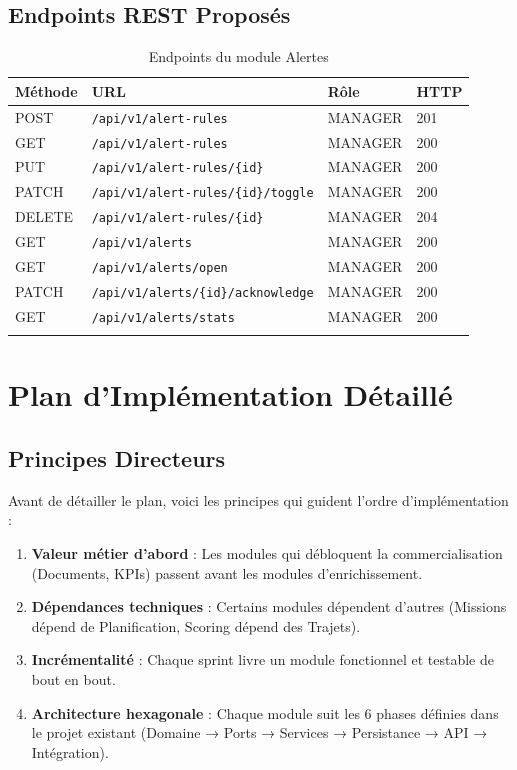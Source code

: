 \documentclass[12pt,a4paper]{report}
\begin{document}
\section{Endpoints REST Proposés}

\begin{longtable}{p{1.5cm}p{7cm}p{2.5cm}p{1.5cm}}
\toprule
\textbf{Méthode} & \textbf{URL} & \textbf{Rôle} & \textbf{HTTP} \\
\midrule
\endhead
POST & \texttt{/api/v1/alert-rules} & MANAGER & 201 \\
GET & \texttt{/api/v1/alert-rules} & MANAGER & 200 \\
PUT & \texttt{/api/v1/alert-rules/\{id\}} & MANAGER & 200 \\
PATCH & \texttt{/api/v1/alert-rules/\{id\}/toggle} & MANAGER & 200 \\
DELETE & \texttt{/api/v1/alert-rules/\{id\}} & MANAGER & 204 \\
GET & \texttt{/api/v1/alerts} & MANAGER & 200 \\
GET & \texttt{/api/v1/alerts/open} & MANAGER & 200 \\
PATCH & \texttt{/api/v1/alerts/\{id\}/acknowledge} & MANAGER & 200 \\
GET & \texttt{/api/v1/alerts/stats} & MANAGER & 200 \\
\bottomrule
\caption{Endpoints du module Alertes}
\end{longtable}

\chapter{Plan d'Implémentation Détaillé}

\section{Principes Directeurs}

Avant de détailler le plan, voici les principes qui guident l'ordre d'implémentation :

\begin{enumerate}[leftmargin=2cm]
  \item \textbf{Valeur métier d'abord} : Les modules qui débloquent la commercialisation (Documents, KPIs) passent avant les modules d'enrichissement.
  \item \textbf{Dépendances techniques} : Certains modules dépendent d'autres (Missions dépend de Planification, Scoring dépend des Trajets).
  \item \textbf{Incrémentalité} : Chaque sprint livre un module fonctionnel et testable de bout en bout.
  \item \textbf{Architecture hexagonale} : Chaque module suit les 6 phases définies dans le projet existant (Domaine → Ports → Services → Persistance → API → Intégration).
\end{enumerate}
\end{document}
